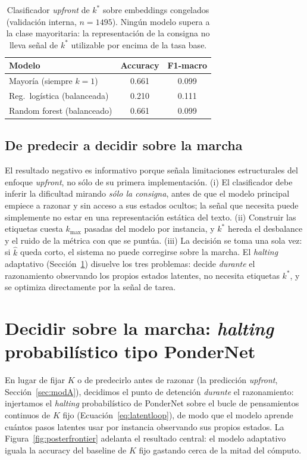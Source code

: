 \documentclass[11pt]{article}
\begin{document}
\begin{table}[t]
  \centering
  \small
  \begin{tabular}{lcc}
    \toprule
    \textbf{Modelo} & \textbf{Accuracy} & \textbf{F1-macro} \\
    \midrule
    Mayoría (siempre $k{=}1$) & 0.661 & 0.099 \\
    Reg.\ logística (balanceada) & 0.210 & 0.111 \\
    Random forest (balanceado) & 0.661 & 0.099 \\
    \bottomrule
  \end{tabular}
  \caption{Clasificador \textit{upfront} de $k^*$ sobre embeddings congelados (validación interna, $n{=}1495$). Ningún modelo supera a la clase mayoritaria: la representación de la consigna no lleva señal de $k^*$ utilizable por encima de la tasa base.}
  \label{tab:clasificador}
\end{table}

\subsection{De predecir a decidir sobre la marcha}
\label{sec:pivot}

El resultado negativo es informativo porque señala limitaciones estructurales del enfoque \textit{upfront}, no sólo de su primera implementación. (i) El clasificador debe inferir la dificultad mirando \emph{sólo la consigna}, antes de que el modelo principal empiece a razonar y sin acceso a sus estados ocultos; la señal que necesita puede simplemente no estar en una representación estática del texto. (ii) Construir las etiquetas cuesta $k_{\max}$ pasadas del modelo por instancia, y $k^*$ hereda el desbalance y el ruido de la métrica con que se puntúa. (iii) La decisión se toma una sola vez: si $\hat{k}$ queda corto, el sistema no puede corregirse sobre la marcha. El \textit{halting} adaptativo (Sección~\ref{sec:modB}) disuelve los tres problemas: decide \emph{durante} el razonamiento observando los propios estados latentes, no necesita etiquetas $k^*$, y se optimiza directamente por la señal de tarea.

\section{Decidir sobre la marcha: \textit{halting} probabilístico tipo PonderNet}
\label{sec:modB}

En lugar de fijar $K$ o de predecirlo antes de razonar (la predicción \textit{upfront}, Sección~\ref{sec:modA}), decidimos el punto de detención \emph{durante} el razonamiento: injertamos el \textit{halting} probabilístico de PonderNet sobre el bucle de pensamientos continuos de $K$ fijo (Ecuación~\ref{eq:latentloop}), de modo que el modelo aprende cuántos pasos latentes usar por instancia observando sus propios estados. La Figura~\ref{fig:posterfrontier} adelanta el resultado central: el modelo adaptativo iguala la accuracy del baseline de $K$ fijo gastando cerca de la mitad del cómputo.
\end{document}
